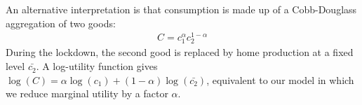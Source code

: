 \documentclass[./ConsumptionResponse]{subfiles}
\begin{document}
An alternative interpretation is that consumption is made up of a Cobb-Douglass aggregation of two goods:
\begin{eqnarray*}
  C = c_1^{\alpha}c_2^{1-\alpha}
\end{eqnarray*}
During the lockdown, the second good is replaced by home production at a fixed level $\bar{c_2}$. A log-utility function gives $\log(C) = \alpha\log(c_1) + (1-\alpha)\log(\bar{c_2})$, equivalent to our model in which we reduce marginal utility by a factor $\alpha$.



\onlyinsubfile{}
\end{document}
